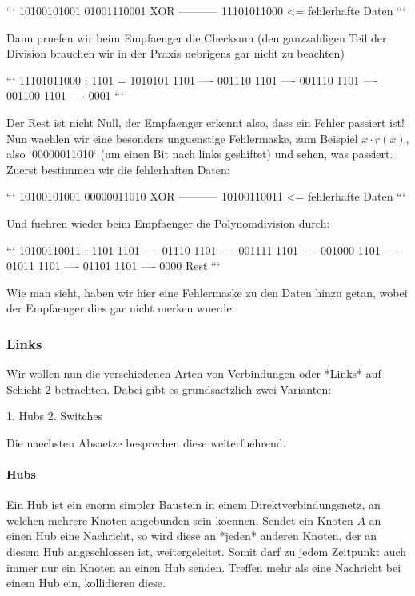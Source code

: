 ```
10100101001
01001110001 XOR
-----------
11101011000 <= fehlerhafte Daten
```

Dann pruefen wir beim Empfaenger die Checksum (den ganzzahligen Teil der
Division brauchen wir in der Praxis uebrigens gar nicht zu beachten)

```
11101011000 : 1101 = 1010101
1101
----
001110
  1101
  ----
  001110
    1101
	----
	001100
	  1101
	  ----
	  0001
```

Der Rest ist nicht Null, der Empfaenger erkennt also, dass ein Fehler passiert
ist! Nun waehlen wir eine besonders unguenstige Fehlermaske, zum Beispiel $x
\cdot r(x)$, also `00000011010` (um einen Bit nach links geshiftet) und sehen,
was passiert. Zuerst bestimmen wir die fehlerhaften Daten:

```
10100101001
00000011010 XOR
-----------
10100110011 <= fehlerhafte Daten
```

Und fuehren wieder beim Empfaenger die Polynomdivision durch:

```
10100110011 : 1101
1101
----
01110
 1101
 ----
 001111
   1101
   ----
   001000
     1101
	 ----
	 01011
	  1101
	  ----
	  01101
	   1101
	   ----
	   0000 Rest
```

Wie man sieht, haben wir hier eine Fehlermaske zu den Daten hinzu getan, wobei
der Empfaenger dies gar nicht merken wuerde.

\subsubsection{Links} 

Wir wollen nun die verschiedenen Arten von Verbindungen oder *Links* auf Schicht
2 betrachten. Dabei gibt es grundsaetzlich zwei Varianten:

1. Hubs
2. Switches

Die naechsten Absaetze besprechen diese weiterfuehrend.

\paragraph{Hubs} 

Ein Hub ist ein enorm simpler Baustein in einem Direktverbindungsnetz, an
welchen mehrere Knoten angebunden sein koennen. Sendet ein Knoten $A$ an einen
Hub eine Nachricht, so wird diese an *jeden* anderen Knoten, der an diesem Hub
angeschlossen ist, weitergeleitet. Somit darf zu jedem Zeitpunkt auch immer nur
ein Knoten an einen Hub senden. Treffen mehr als eine Nachricht bei einem Hub
ein, kollidieren diese.

